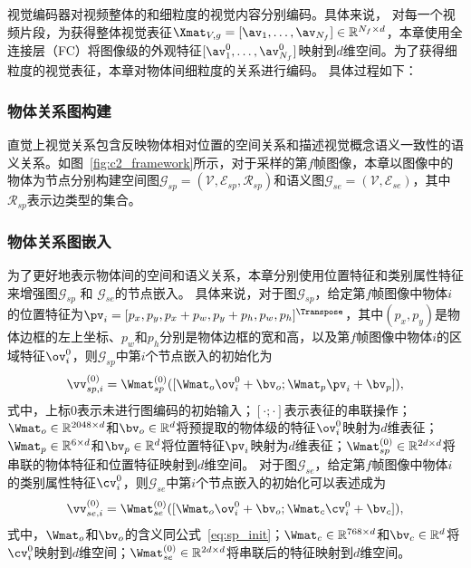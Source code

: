 视觉编码器对视频整体的和细粒度的视觉内容分别编码。具体来说，
对每一个视频片段，为获得整体视觉表征$\Xmat_{V, g}=[\av_1,\dots,\av_{N_f}]\in \mathbb{R}^{N_f \times d}$，本章使用全连接层（FC）将图像级的外观特征$[\av_1^{0}, \dots, \av_{N_f}^{0}]$映射到$d$维空间。为了获得细粒度的视觉表征，本章对物体间细粒度的关系进行编码。
具体过程如下：


\subsubsection{物体关系图构建}
直觉上视觉关系包含反映物体相对位置的空间关系和描述视觉概念语义一致性的语义关系。如图~\ref{fig:c2_framework}所示，对于采样的第$f$帧图像，本章以图像中的物体为节点分别构建空间图$\mathcal{G}_{sp} = (\mathcal{V}, \mathcal{E}_{sp}, \mathcal{R}_{sp})$和语义图$\mathcal{G}_{se} = (\mathcal{V}, \mathcal{E}_{se})$，其中$\mathcal{R}_{sp}$表示边类型的集合。


\subsubsection{物体关系图嵌入}
为了更好地表示物体间的空间和语义关系，本章分别使用位置特征和类别属性特征来增强图$\mathcal{G}_{sp}$ 和 $\mathcal{G}_{se}$的节点嵌入。
具体来说，对于图$\mathcal{G}_{sp}$，给定第$f$帧图像中物体$i$的位置特征为$\pv_i = [p_x, p_y, p_x + p_w, p_y + p_h, p_w, p_h]^{\Transpose}$，其中$(p_x, p_y)$是物体边框的左上坐标、$p_w$和$p_h$分别是物体边框的宽和高，以及第$f$帧图像中物体$i$的区域特征$\ov_i^{0}$，则$\mathcal{G}_{sp}$中第$i$个节点嵌入的初始化为
\begin{align}
\vv_{sp,i}^{(0)} = \Wmat_{sp}^{(0)}([\Wmat_o\ov_i^{0} + \bv_o; \Wmat_{p} \pv_i + \bv_p]), 
\label{eq:sp_init}
\end{align}
式中，上标0表示未进行图编码的初始输入；$[\cdot; \cdot]$表示表征的串联操作；$\Wmat_{o} \in \mathbb{R}^{\text{2048} \times d}$和$\bv_o \in \mathbb{R}^{d}$将预提取的物体级的特征$\ov_i^{0}$映射为$d$维表征；$\Wmat_{p} \in \mathbb{R}^{\text{6} \times d}$和$\bv_p \in \mathbb{R}^{d}$将位置特征$\pv_i$映射为$d$维表征；$\Wmat_{sp}^{(0)} \in \mathbb{R}^{2d\times d}$将串联的物体特征和位置特征映射到$d$维空间。
对于图$\mathcal{G}_{se}$，给定第$f$帧图像中物体$i$的类别属性特征$\cv^{0}_i$，则$\mathcal{G}_{se}$中第$i$个节点嵌入的初始化可以表述成为
\begin{align}
\vv_{se,i}^{(0)} = \Wmat_{se}^{(0)}([\Wmat_o\ov_i^{0} + \bv_o; \Wmat_{c} \cv_i^{0} + \bv_c]), 
\end{align}
式中，$\Wmat_{o}$和$\bv_o$的含义同公式~\eqref{eq:sp_init}；$\Wmat_{c} \in \mathbb{R}^{\text{768} \times d}$和$\bv_c \in \mathbb{R}^{d}$将$\cv_i^{0}$映射到$d$维空间；$\Wmat_{se}^{(0)} \in \mathbb{R}^{2d\times d}$将串联后的特征映射到$d$维空间。


